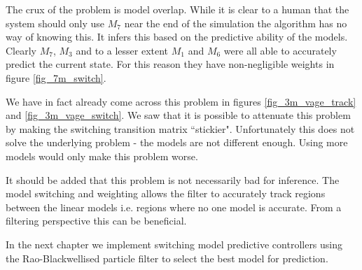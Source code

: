 The crux of the problem is model overlap. While it is clear to a human that the system should only use $M_7$ near the end of the simulation the algorithm has no way of knowing this. It infers this based on the predictive ability of the models. Clearly $M_7$, $M_3$ and to a lesser extent $M_1$ and $M_6$ were all able to accurately predict the current state. For this reason they have non-negligible weights in figure \ref{fig_7m_switch}.  

We have in fact already come across this problem in figures \ref{fig_3m_vage_track} and \ref{fig_3m_vage_switch}. We saw that it is possible to attenuate this problem by making the switching transition matrix ``stickier". Unfortunately this does not solve the underlying problem - the models are not different enough. Using more models would only make this problem worse.

It should be added that this problem is not necessarily bad for inference. The model switching and weighting allows the filter to accurately track regions between the linear models i.e. regions where no one model is accurate. From a filtering perspective this can be beneficial.

In the next chapter we implement switching model predictive controllers using the Rao-Blackwellised particle filter to select the best model for prediction.